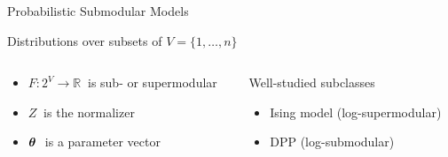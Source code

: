 \documentclass[mathserif]{beamer}
\begin{document}
\begin{frame}{Probabilistic Submodular Models}

\begin{center}
Distributions over subsets of $V = \{1,\ldots,n\}$

\vspace{0.8em}
\end{center}
\vspace{1.5em}

\begin{columns}
\begin{column}{0.54\textwidth}
\begin{itemize}
\item $F : 2^V \to \mathbb{R}\ $ is sub- or supermodular
\item $Z\ $ is the normalizer
\item $\bm{\theta}\ $ is a parameter vector
\end{itemize}
\vspace{0.6em}
\end{column}
\begin{column}{0.39\textwidth}
Well-studied subclasses
\begin{itemize}
\item Ising model (log-supermodular)
\item DPP (log-submodular)
\end{itemize}
\end{column}
\end{columns}

\end{frame}
\end{document}
